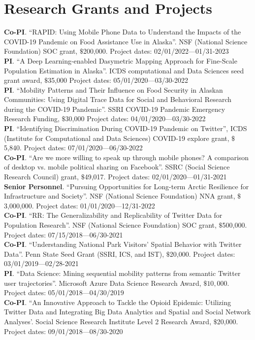 \documentclass[11pt, a4paper]{article}
\begin{document}
\section*{Research Grants and Projects}
\textbf{Co-PI}. ``RAPID: Using Mobile Phone Data to Understand the Impacts of the COVID-19 Pandemic on Food Assistance Use in Alaska''. NSF (National Science Foundation) SOC grant, $\$$200,000. Project dates: 02/01/2022—01/31-2023\\
\textbf{PI}. ``A Deep Learning-enabled Dasymetric Mapping Approach for Fine-Scale Population Estimation in Alaska''. ICDS computational and Data Sciences seed grant award, $\$$35,000 Project dates: 05/01/2020—03/30-2022\\
\textbf{PI}. ``Mobility Patterns and Their Influence on Food Security in Alaskan Communities: Using Digital Trace Data for Social and Behavioral Research during the COVID-19 Pandemic''. SSRI COVID-19 Pandemic Emergency Research Funding, $\$$30,000 Project dates: 04/01/2020—03/30-2022\\
\textbf{PI}. ``Identifying Discrimination During COVID-19 Pandemic on Twitter'',  ICDS (Institute for Computational and Data Sciences) COVID-19 explore grant, $\$$5,840. Project dates: 07/01/2020—06/30-2022\\
\textbf{Co-PI}. ``Are we more willing to speak up through mobile phones?  A comparison of desktop vs. mobile political sharing on Facebook''. SSRC (Social Science Research Council) grant, $\$$49,017. Project dates: 02/01/2020—01/31-2021\\
\textbf{Senior Personnel}. ``Pursuing Opportunities for Long-term Arctic Resilience for Infrastructure and Society''. NSF (National Science Foundation) NNA grant, $\$$3,000,000. Project dates: 01/01/2020—12/31-2022\\
\textbf{Co-PI}. ``RR: The Generalizability and Replicability of Twitter Data for Population Research''. NSF (National Science Foundation) SOC grant, $\$$500,000. Project dates: 07/15/2018—06/30-2021\\
\textbf{Co-PI}. ``Understanding National Park Visitors’ Spatial Behavior with Twitter Data''. Penn State Seed Grant (SSRI, ICS, and IST), $\$$20,000. Project dates: 03/01/2019—02/28-2021\\
\textbf{PI}. ``Data Science: Mining sequential mobility patterns from semantic Twitter user trajectories''. Microsoft Azure Data Science Research Award, $\$10,000$. Project dates: 05/01/2018—04/30/2019\\
\textbf{Co-PI}. ``An Innovative Approach to Tackle the Opioid Epidemic: Utilizing Twitter Data and Integrating Big Data Analytics and Spatial and Social Network Analyses'. Social Science Research Institute Level 2 Research Award, $\$$20,000. Project dates: 09/01/2018—08/30-2020\\
\end{document}
